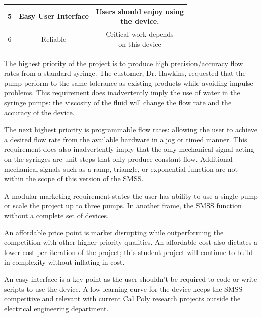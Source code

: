 \documentclass[journal]{IEEEtran}
\begin{document}
\begin{table}[H]
\begin{center}
\begin{tabular}{|c|c|c|}
                        5 & Easy User Interface & 
                        \makecell[l]{Users should enjoy using\\
                                     the device.} \\
                        \hline
                        
                        6 & Reliable & 
                        \makecell[l]{Critical work depends\\
                                     on this device} \\
                        \hline
        
                    \end{tabular}
                \end{center}
            \end{table}
            
            The highest priority of the project is to produce high precision/accuracy flow rates from a standard syringe. The customer, Dr. Hawkins, requested that the pump perform to the same tolerance as existing products while avoiding impulse problems. This requirement does inadvertently imply the use of water in the syringe pumps: the viscosity of the fluid will change the flow rate and the accuracy of the device.
            
            The next highest priority is programmable flow rates: allowing the user to achieve a desired flow rate from the available hardware in a jog or timed manner. This requirement does also inadvertently imply that the only mechanical signal acting on the syringes are unit steps that only produce constant flow. Additional mechanical signals such as a ramp, triangle, or exponential function are not within the scope of this version of the SMSS.
            
            A modular marketing requirement states the user has ability to use a single pump or scale the project up to three pumps. In another frame, the SMSS function without a complete set of devices.
            
            An affordable price point is market disrupting while outperforming the competition with other higher priority qualities. An affordable cost also dictates a lower cost per iteration of the project; this student project will continue to build in complexity without inflating in cost.
            
            An easy interface is a key point as the user shouldn't be required to code or write scripts to use the device. A low learning curve for the device keeps the SMSS competitive and relevant with current Cal Poly research projects outside the electrical engineering department.
            
\end{document}

